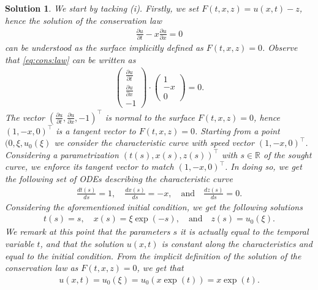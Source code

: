 \documentclass[10pt,letterpaper]{article}
\theoremstyle{break}
\newtheorem{mysolution}{Solution}
\newenvironment{solution}{\begin{mysolution}}{\end{mysolution}}
\begin{document}
\begin{solution}
	We start by tacking (i).
	Firstly, we set $F(t,x,z) = u(x,t) -z$, hence the solution
	of the conservation law
	\begin{align}\label{eq:cons:law}
		\frac{\partial u}{\partial t}
		-
		x
		\frac{\partial u}{\partial x}
		= 0
	\end{align}
	can be understood as the surface implicitly defined as $F(t,x,z) = 0$.
	Observe that \ref{eq:cons:law} can be written as
	\begin{align}
		\begin{pmatrix}
			\frac{\partial u}{\partial t} \\
			\frac{\partial u}{\partial x} \\
			-1
		\end{pmatrix}
		\cdot
		\begin{pmatrix}
		1 \\
		-x \\
		0
		\end{pmatrix}
		= 0.
	\end{align}
	The vector $(\frac{\partial u}{\partial t},\frac{\partial u}{\partial x} ,-1)^\top $
	is normal to the surface $F(t,x,z) =0$, hence
	$(1,-x,0)^\top$ is a tangent vector to $F(t,x,z) =0$.
	Starting from a point $(0,\xi,u_0(\xi)$ we consider the characteristic curve
	with speed vector $(1,-x,0)^\top$. Considering a parametrization
	$(t(s),x(s),z(s))^\top$ with $s \in \mathbb{R}$ of the sought curve, we enforce its tangent 
	vector to match $ (1,-x,0)^\top$. In doing so, we get the following set of ODEs
	describing the characteristic curve
	\begin{align}
		\frac{dt(s)}{ds} =1,
		\quad
		\frac{dx(s)}{ds} =-x,
		\quad
		\text{and}
		\quad
		\frac{dz(s)}{ds} =0.
	\end{align}
	Considering the aforementioned initial condition, we get the following solutions
	\begin{align}
		t(s) =s,
		\quad
		x(s) = \xi \exp(-s),
		\quad
		\text{and}
		\quad
		z(s) = u_0(\xi).
	\end{align}
	We remark at this point that the parameters $s$ it is 
	actually equal to the temporal variable $t$, and that
	the solution $u(x,t)$ is constant along the characteristics
	and equal to the initial condition. 
	From the implicit definition of the solution of the conservation law
	as $F(t,x,z) =0$, we get that 
	\begin{align}\label{eq:cons:law_sol}
		u(x,t) = u_0(\xi) = u_0(x \exp(t)) = x \exp(t).
	\end{align}

\end{solution}
\end{document}
